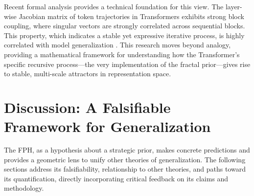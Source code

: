 \documentclass[11pt,a4paper]{article}
\begin{document}
Recent formal analysis provides a technical foundation for this view. The layer-wise Jacobian matrix of token trajectories in Transformers exhibits strong block coupling, where singular vectors are strongly correlated across sequential blocks. This property, which indicates a stable yet expressive iterative process, is highly correlated with model generalization \citep{noci2024transformer}. This research moves beyond analogy, providing a mathematical framework for understanding how the Transformer's specific recursive process—the very implementation of the fractal prior—gives rise to stable, multi-scale attractors in representation space.

\section{Discussion: A Falsifiable Framework for Generalization}
The FPH, as a hypothesis about a strategic prior, makes concrete predictions and provides a geometric lens to unify other theories of generalization. The following sections address its falsifiability, relationship to other theories, and paths toward its quantification, directly incorporating critical feedback on its claims and methodology.
\end{document}
